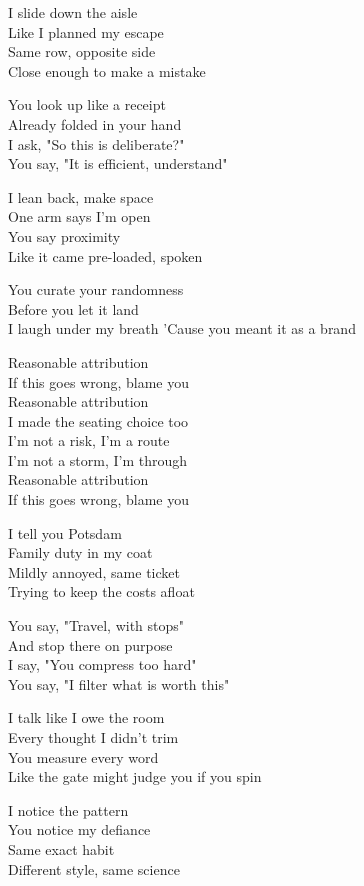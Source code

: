 \begin{lyrics}
I slide down the aisle\\
Like I planned my escape\\
Same row, opposite side\\
Close enough to make a mistake

You look up like a receipt\\
Already folded in your hand\\
I ask, "So this is deliberate?"\\
You say, "It is efficient, understand"

I lean back, make space\\
One arm says I'm open\\
You say proximity\\
Like it came pre-loaded, spoken

You curate your randomness\\
Before you let it land\\
I laugh under my breath
'Cause you meant it as a brand

Reasonable attribution\\
If this goes wrong, blame you\\
Reasonable attribution\\
I made the seating choice too\\
I'm not a risk, I'm a route\\
I'm not a storm, I'm through\\
Reasonable attribution\\
If this goes wrong, blame you

I tell you Potsdam\\
Family duty in my coat\\
Mildly annoyed, same ticket\\
Trying to keep the costs afloat

You say, "Travel, with stops"\\
And stop there on purpose\\
I say, "You compress too hard"\\
You say, "I filter what is worth this"

I talk like I owe the room\\
Every thought I didn't trim\\
You measure every word\\
Like the gate might judge you if you spin

I notice the pattern\\
You notice my defiance\\
Same exact habit\\
Different style, same science


\end{lyrics}

